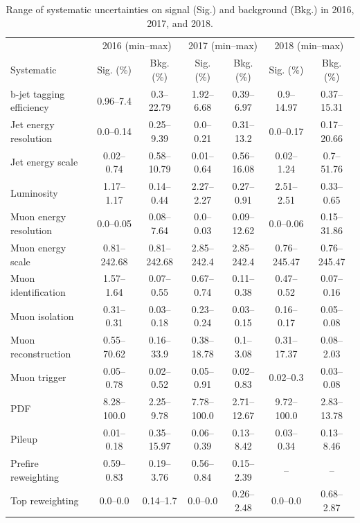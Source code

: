 \begin{table}[H]
	\begin{center}
        \begin{footnotesize}
			\caption{Range of systematic uncertainties on signal (Sig.) and background (Bkg.) in 2016, 2017, and 2018.}
			\begin{tabular}{lcccccc} \hline\hline
				 & \multicolumn{2}{c}{2016 (min--max)} & \multicolumn{2}{c}{2017 (min--max)} & \multicolumn{2}{c}{2018 (min--max)} \\
				Systematic & Sig. (\%) & Bkg. (\%) & Sig. (\%) & Bkg. (\%) & Sig. (\%) & Bkg. (\%) \\ \hline
				b-jet tagging efficiency & 0.96--7.4 & 0.3--22.79 & 1.92--6.68 & 0.39--6.97 & 0.9--14.97 & 0.37--15.31 \\
				Jet energy resolution & 0.0--0.14 & 0.25--9.39 & 0.0--0.21 & 0.31--13.2 & 0.0--0.17 & 0.17--20.66 \\
				Jet energy scale & 0.02--0.74 & 0.58--10.79 & 0.01--0.64 & 0.56--16.08 & 0.02--1.24 & 0.7--51.76 \\
				Luminosity & 1.17--1.17 & 0.14--0.44 & 2.27--2.27 & 0.27--0.91 & 2.51--2.51 & 0.33--0.65 \\
				Muon energy resolution & 0.0--0.05 & 0.08--7.64 & 0.0--0.03 & 0.09--12.62 & 0.0--0.06 & 0.15--31.86 \\
				Muon energy scale & 0.81--242.68 & 0.81--242.68 & 2.85--242.4 & 2.85--242.4 & 0.76--245.47 & 0.76--245.47 \\
				Muon identification & 1.57--1.64 & 0.07--0.55 & 0.67--0.74 & 0.11--0.38 & 0.47--0.52 & 0.07--0.16 \\
				Muon isolation & 0.31--0.31 & 0.03--0.18 & 0.23--0.24 & 0.03--0.15 & 0.16--0.17 & 0.05--0.08 \\
				Muon reconstruction & 0.55--70.62 & 0.16--33.9 & 0.38--18.78 & 0.1--3.08 & 0.31--17.37 & 0.08--2.03 \\
				Muon trigger & 0.05--0.78 & 0.02--0.52 & 0.05--0.91 & 0.02--0.83 & 0.02--0.3 & 0.03--0.08 \\
				PDF & 8.28--100.0 & 2.25--9.78 & 7.78--100.0 & 2.71--12.67 & 9.72--100.0 & 2.83--13.78 \\
				Pileup & 0.01--0.18 & 0.35--15.97 & 0.06--0.39 & 0.13--8.42 & 0.03--0.34 & 0.13--8.46 \\
				Prefire reweighting & 0.59--0.83 & 0.19--3.76 & 0.56--0.84 & 0.15--2.39 & -- & -- \\
				Top \pt reweighting & 0.0--0.0 & 0.14--1.7 & 0.0--0.0 & 0.26--2.48 & 0.0--0.0 & 0.68--2.87 \\

\end{tabular}
\end{footnotesize}
\end{center}
\end{table}
